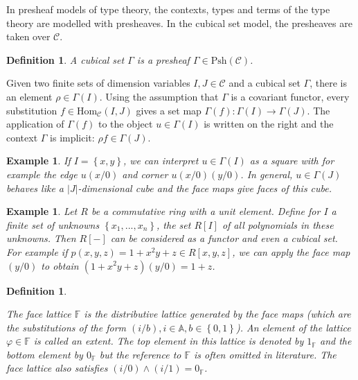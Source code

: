 \documentclass[11pt,a4paper,twoside,xetex,draft]{book}
\newcommand{\keyword}[1]{\emph{#1}\index{#1}}
\newtheorem{definition}[theorem]{Definition}
\newtheorem{example}[theorem]{Example}
\newcommand{\Psh}[1]{\text{Psh}\left(#1\right)}
\newcommand{\homo}[3]{\text{Hom}_{#1}\left(#2,#3\right)}
\begin{document}
In presheaf models of type theory, the contexts, types and terms of the type theory are modelled with presheaves. In the cubical set model, the presheaves are taken over $\mathcal{C}$.

\begin{definition}\label{cubset}
A \keyword{cubical set} $\Gamma$ is a presheaf $\Gamma \in \Psh{\mathcal{C}}$.
\end{definition}

Given two finite sets of dimension variables $I,J \in \mathcal{C}$ and a cubical set $\Gamma$,
there is an element $\rho \in \Gamma (I)$. Using the assumption that $\Gamma$ 
is a covariant functor, every substitution $f \in \homo{\mathcal{C}}{I}{J}$ gives a set map $\Gamma (f) : \Gamma (I) \rightarrow \Gamma (J)$. 
The application of $\Gamma(f)$ to the object $u \in \Gamma (I)$ is written on the right and the context $\Gamma$ is implicit: $\rho f \in \Gamma(J)$. 

\begin{example}
If $I = \left\{x,y \right\}$, we can interpret $u \in \Gamma(I)$ as a square with for example the edge $u(x/0)$ and corner $u(x/0)(y/0)$. In general, $u\in \Gamma (J)$ behaves like a $|J|$-dimensional cube and the face maps give faces of this cube.
\end{example}

\begin{example}
Let $R$ be a commutative ring with a unit element. Define for $I$ a finite set of unknowns $\left\{x_1 , ..., x_n \right\}$, the set $R[I]$ of all polynomials in these unknowns. Then $R[-]$ can be considered as a functor and even a cubical set. For example if $p(x,y,z) = 1 + x^2y +z \in R[x,y,z]$, we can apply the face map $(y/0)$ to obtain $(1+x^2 y +z ) (y/0) = 1+z$.
\end{example}


\begin{definition}\label{facelattice}

The \keyword{face lattice} $\mathbb{F}$ is the distributive lattice generated by the face maps (which are the substitutions of the form $(i/b), i\in \mathbb{A}, b \in \left\{ 0,1 \right\}$). An element of the lattice $\varphi \in \mathbb{F}$ is called an \keyword{extent}. The top element in this lattice is denoted by $1_{\mathbb{F}}$ and the bottom element by $0_{\mathbb{F}}$ but the reference to $\mathbb{F}$ is often omitted in literature. The face lattice also satisfies $(i/0) \wedge (i/1) = 0_{\mathbb{F}}$. 
\end{definition}
\end{document}
